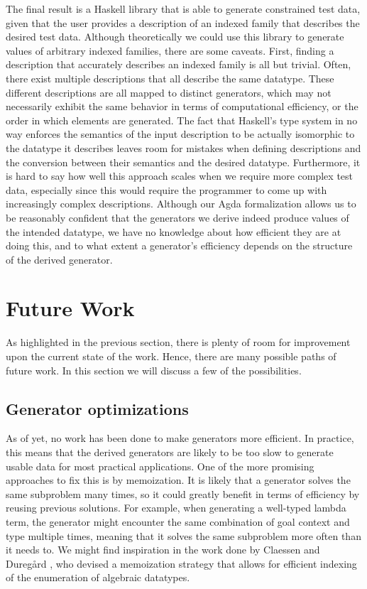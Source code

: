 \documentclass[a4paper,msc,twosized=semi]{uustthesis}
\begin{document}
  The final result is a Haskell library that is able to generate constrained test data, given that the user provides a description of an indexed family that describes the desired test data. Although theoretically we could use this library to generate values of arbitrary indexed families, there are some caveats. First, finding a description that accurately describes an indexed family is all but trivial. Often, there exist multiple descriptions that all describe the same datatype. These different descriptions are all mapped to distinct generators, which may not necessarily exhibit the same behavior in terms of computational efficiency, or the order in which elements are generated. The fact that Haskell's type system in no way enforces the semantics of the input description to be actually isomorphic to the datatype it describes leaves room for mistakes when defining descriptions and the conversion between their semantics and the desired datatype. Furthermore, it is hard to say how well this approach scales when we require more complex test data, especially since this would require the programmer to come up with increasingly complex descriptions. Although our Agda formalization allows us to be reasonably confident that the generators we derive indeed produce values of the intended datatype, we have no knowledge about how efficient they are at doing this, and to what extent a generator's efficiency depends on the structure of the derived generator. 

\section{Future Work}

  As highlighted in the previous section, there is plenty of room for improvement upon the current state of the work. Hence, there are many possible paths of future work. In this section we will discuss a few of the possibilities. 

\subsection{Generator optimizations}

  As of yet, no work has been done to make generators more efficient. In practice, this means that the derived generators are likely to be too slow to generate usable data for most practical applications. One of the more promising approaches to fix this is by memoization. It is likely that a generator solves the same subproblem many times, so it could greatly benefit in terms of efficiency by reusing previous solutions. For example, when generating a well-typed lambda term, the generator might encounter the same combination of goal context and type multiple times, meaning that it solves the same subproblem more often than it needs to. We might find inspiration in the work done by Claessen and Dureg{\aa}rd \cite{duregaard2013feat}, who devised a memoization strategy that allows for efficient indexing of the enumeration of algebraic datatypes. 
\end{document}
